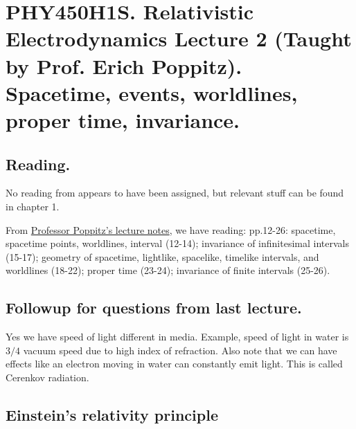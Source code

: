 
%

\chapter{PHY450H1S.  Relativistic Electrodynamics Lecture 2 (Taught by Prof. Erich Poppitz).  Spacetime, events, worldlines, proper time, invariance.}
\label{chap:relativisticElectrodynamicsL2}
{}
\date{Jan 12, 2011}

\beginArtNoToc

\section{Reading.}

No reading from \cite{landau1980classical} appears to have been assigned, but relevant stuff can be found in chapter 1.

From \href{http://www.physics.utoronto.ca/~poppitz/e-poppitz/PHY450_files/RelEM12-26.pdf}{Professor Poppitz's lecture notes}, we have reading: pp.12-26: spacetime, spacetime points, worldlines, interval (12-14); invariance of infinitesimal intervals (15-17);  geometry of spacetime, lightlike, spacelike, timelike intervals, and worldlines (18-22); proper time (23-24); invariance of finite intervals (25-26).

\section{Followup for questions from last lecture.}

Yes we have speed of light different in media.  Example, speed of light in water is $3/4$ vacuum speed due to high index of refraction.  Also note that we can have effects like an electron moving in water can constantly emit light.  This is called Cerenkov radiation.

\section{Einstein's relativity principle}

